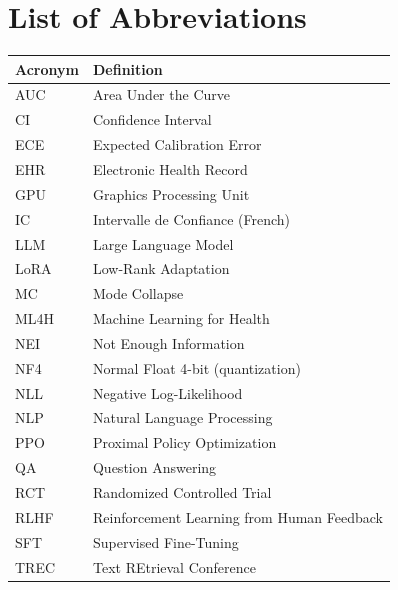 
\chapter*{List of Abbreviations}

\begin{tabular}{@{}p{3cm}l@{}}
\toprule
\textbf{Acronym} & \textbf{Definition} \\
\midrule
AUC   & Area Under the Curve \\
CI    & Confidence Interval \\
ECE   & Expected Calibration Error \\
EHR   & Electronic Health Record \\
GPU   & Graphics Processing Unit \\
IC    & Intervalle de Confiance (French) \\
LLM   & Large Language Model \\
LoRA  & Low-Rank Adaptation \\
MC    & Mode Collapse \\
ML4H  & Machine Learning for Health \\
NEI   & Not Enough Information \\
NF4   & Normal Float 4-bit (quantization) \\
NLL   & Negative Log-Likelihood \\
NLP   & Natural Language Processing \\
PPO   & Proximal Policy Optimization \\
QA    & Question Answering \\
RCT   & Randomized Controlled Trial \\
RLHF  & Reinforcement Learning from Human Feedback \\
SFT   & Supervised Fine-Tuning \\
TREC  & Text REtrieval Conference \\
\bottomrule
\end{tabular}

\cleardoublepage
